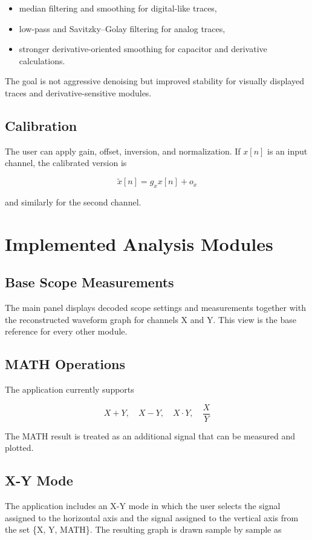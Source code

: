 \documentclass[conference]{IEEEtran}
\begin{document}
\begin{itemize}
    \item median filtering and smoothing for digital-like traces,
    \item low-pass and Savitzky--Golay filtering for analog traces,
    \item stronger derivative-oriented smoothing for capacitor and derivative calculations.
\end{itemize}

The goal is not aggressive denoising but improved stability for visually displayed traces and derivative-sensitive modules.

\subsection{Calibration}
The user can apply gain, offset, inversion, and normalization. If $x[n]$ is an input channel, the calibrated version is

\begin{equation}
\tilde{x}[n] = g_x x[n] + o_x
\end{equation}

and similarly for the second channel.

\section{Implemented Analysis Modules}
\subsection{Base Scope Measurements}
The main panel displays decoded scope settings and measurements together with the reconstructed waveform graph for channels X and Y. This view is the base reference for every other module.

\subsection{MATH Operations}
The application currently supports

\begin{equation}
X + Y,\quad X - Y,\quad X \cdot Y,\quad \frac{X}{Y}
\end{equation}

The MATH result is treated as an additional signal that can be measured and plotted.

\subsection{X-Y Mode}
The application includes an X-Y mode in which the user selects the signal assigned to the horizontal axis and the signal assigned to the vertical axis from the set \{X, Y, MATH\}. The resulting graph is drawn sample by sample as
\end{document}
